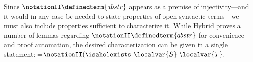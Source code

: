 \documentclass[copyright,creativecommons]{eptcs}
\begin{document}
Since \(\notationII \definedterm{abstr}\) appears as a premise of injectivity---and it would in any
case be needed to state properties of open syntactic terms---we must also
include properties sufficient to characterize it.  While Hybrid proves a
number of lemmas regarding \(\notationII \definedterm{abstr}\) for convenience and proof automation,
the desired characterization can be given in a single statement:
{=\hbox{\(\notationII  ( \isaholexists\ \localvar{S}\ \localvar{T}. {} \)}
 \xdef\ajmtemp{\the\wd0}}
\end{document}
